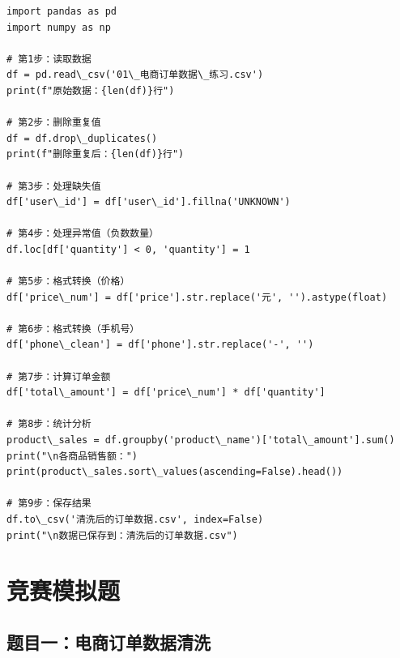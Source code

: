 \documentclass[12pt,a4paper]{article}
\begin{document}
\begin{lstlisting}[caption={完整的数据处理流程}]
import pandas as pd
import numpy as np

# 第1步：读取数据
df = pd.read\_csv('01\_电商订单数据\_练习.csv')
print(f"原始数据：{len(df)}行")

# 第2步：删除重复值
df = df.drop\_duplicates()
print(f"删除重复后：{len(df)}行")

# 第3步：处理缺失值
df['user\_id'] = df['user\_id'].fillna('UNKNOWN')

# 第4步：处理异常值（负数数量）
df.loc[df['quantity'] < 0, 'quantity'] = 1

# 第5步：格式转换（价格）
df['price\_num'] = df['price'].str.replace('元', '').astype(float)

# 第6步：格式转换（手机号）
df['phone\_clean'] = df['phone'].str.replace('-', '')

# 第7步：计算订单金额
df['total\_amount'] = df['price\_num'] * df['quantity']

# 第8步：统计分析
product\_sales = df.groupby('product\_name')['total\_amount'].sum()
print("\n各商品销售额：")
print(product\_sales.sort\_values(ascending=False).head())

# 第9步：保存结果
df.to\_csv('清洗后的订单数据.csv', index=False)
print("\n数据已保存到：清洗后的订单数据.csv")
\end{lstlisting}

\section{竞赛模拟题}

\subsection{题目一：电商订单数据清洗}
\end{document}
